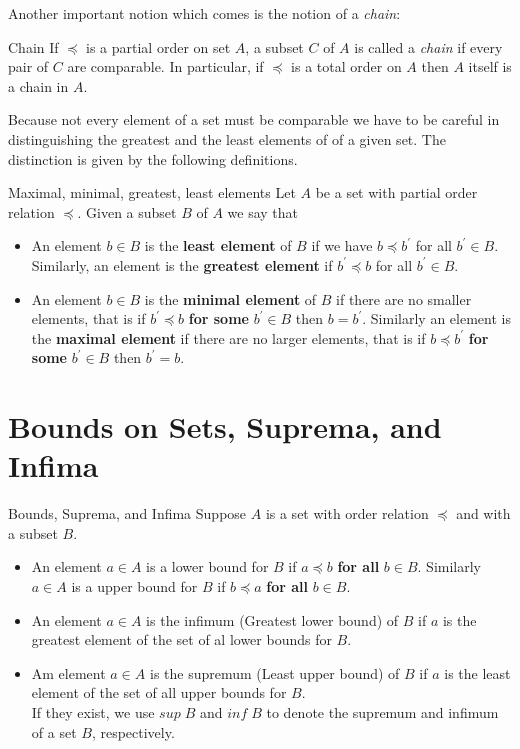 \documentclass[16pt,a4paper]{article}
\theoremstyle{definition}
\newcommand{\ord}{\preceq}
\begin{document}
Another important notion which comes is the notion of a \textit{chain}:
\begin{defn}{Chain}{}
If $\ord$ is a partial order on set $A$, a subset $C$ of $A$ is called a \textit{chain} if every pair of $C$ are comparable. In particular, if $\ord$ is a total order on $A$ then $A$ itself is a chain in $A$. 
\end{defn}

Because not every element of a set must be comparable we have to be careful in distinguishing the greatest and the least elements of of a given set. The distinction is given by the following definitions. 
\begin{defn}{Maximal, minimal, greatest, least elements}{}
Let $A$ be a set with partial order relation $\ord$. Given a subset $B$ of $A$ we say that 
\begin{itemize}
\item An element $b\in B$ is the \textbf{least element} of $B$ if we have $b\ord b^\prime$ for all $b^\prime \in B$. Similarly, an element is the \textbf{greatest element} if $b^\prime \ord b$ for all $b^\prime\in B$. 

\item An element $b\in B$ is the \textbf{minimal element} of $B$ if there are no smaller elements, that is if $b^\prime \ord b$ \textbf{for some} $b^\prime \in B$ then $b = b^\prime$. Similarly an element is the \textbf{maximal element} if there are no larger elements, that is if $b \ord b^\prime$ \textbf{for some} $b^\prime \in B$ then $b^\prime = b$. 
\end{itemize}
\end{defn}

\newpage
\section{Bounds on Sets, Suprema, and Infima}
\begin{defn}{Bounds, Suprema, and Infima}{}
Suppose $A$ is a set with order relation $\ord$ and with a subset $B$. 
\begin{itemize}
\item An element $a\in A$ is a lower bound for $B$ if $a\ord b$ \textbf{for all} $b\in B$. Similarly $a\in A$ is a upper bound for $B$ if $b \ord a$ \textbf{for all} $b\in B$. 

\item An element $a\in A$ is the infimum (Greatest lower bound) of $B$ if $a$ is the greatest element of the set of al lower bounds for $B$. 

\item Am element $a\in A$ is the supremum (Least upper bound) of $B$ if $a$ is the least element of the set of all upper bounds for $B$. 
\\
If they exist, we use $sup\;B$ and $inf \;B$ to denote the supremum and infimum of a set $B$, respectively.
 
\end{itemize}
\end{defn}
\end{document}
